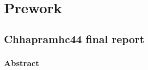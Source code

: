 \documentclass[a4paper, 11pt, oneside]{report}
\begin{document}
\chapter{Prework}
\section{Chhapramhc44 final report}

\subsection{Abstract}
\end{document}
